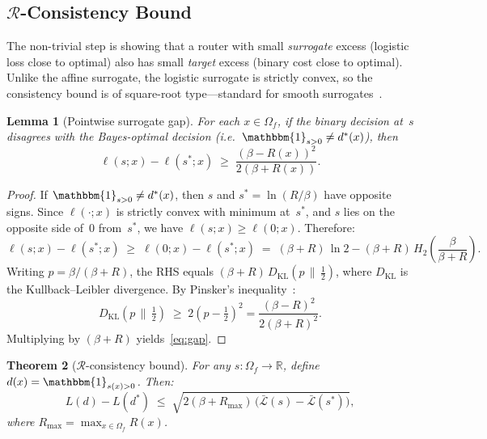 \documentclass[11pt]{article}
\newtheorem{theorem}{Theorem}
\newtheorem{lemma}[theorem]{Lemma}
\newcommand{\R}{\mathbb{R}}
\newcommand{\Lcal}{\mathcal{L}}
\newcommand{\Rcal}{\mathcal{R}}
\newcommand{\KL}{\mathrm{KL}}
\newcommand{\ind}{\mathbbm{1}}
\begin{document}
\subsection{\texorpdfstring{$\Rcal$}{R}-Consistency Bound}

The non-trivial step is showing that a router with small \emph{surrogate} excess
(logistic loss close to optimal) also has small \emph{target} excess (binary cost
close to optimal).  Unlike the affine surrogate, the logistic surrogate is strictly
convex, so the consistency bound is of square-root type---standard for smooth
surrogates~\cite{bartlett2006convexity}.

\begin{lemma}[Pointwise surrogate gap]\label{lem:gap}
For each $x \in \Omega_f$, if the binary decision at~$s$ disagrees with the
Bayes-optimal decision (i.e.\ $\ind_{s > 0} \ne d^*(x)$), then
\begin{equation}\label{eq:gap}
  \ell(s; x) - \ell(s^*; x)
  \;\ge\;
  \frac{(\beta - R(x))^2}{2(\beta + R(x))}.
\end{equation}
\end{lemma}

\begin{proof}
If $\ind_{s > 0} \ne d^*(x)$, then $s$ and $s^* = \ln(R/\beta)$ have opposite signs.
Since $\ell(\cdot; x)$ is strictly convex with minimum at~$s^*$, and $s$ lies on the
opposite side of~$0$ from~$s^*$, we have $\ell(s; x) \ge \ell(0; x)$.  Therefore:
\begin{equation}
  \ell(s; x) - \ell(s^*; x)
  \;\ge\; \ell(0; x) - \ell(s^*; x)
  \;=\; (\beta + R)\,\ln 2 - (\beta + R)\,H_2\!\!\left(\frac{\beta}{\beta + R}\right).
\end{equation}
Writing $p = \beta/(\beta + R)$, the RHS equals
$(\beta + R)\,D_{\KL}(p \,\|\, \tfrac{1}{2})$,
where $D_{\KL}$ is the Kullback--Leibler divergence.  By Pinsker's
inequality~\cite{csiszar1967information}:
\begin{equation}
  D_{\KL}\!\left(p \,\Big\|\, \tfrac{1}{2}\right)
  \;\ge\; 2\left(p - \tfrac{1}{2}\right)^2
  = \frac{(\beta - R)^2}{2(\beta + R)^2}.
\end{equation}
Multiplying by $(\beta + R)$ yields~\eqref{eq:gap}.
\end{proof}

\begin{theorem}[$\Rcal$-consistency bound]\label{thm:r-consistency}
For any $s \colon \Omega_f \to \R$, define $d(x) = \ind_{s(x) > 0}$.  Then:
\begin{equation}\label{eq:r-consistency}
  L(d) - L(d^*)
  \;\le\;
  \sqrt{2(\beta + R_{\max})\,
    \bigl(\bar{\Lcal}(s) - \bar{\Lcal}(s^*)\bigr)},
\end{equation}
where $R_{\max} = \max_{x \in \Omega_f} R(x)$.
\end{theorem}
\end{document}
